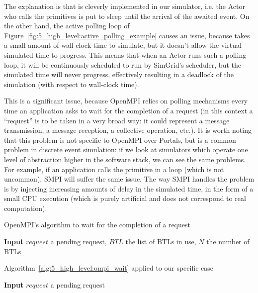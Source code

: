 The explanation is that  is cleverly implemented in our
simulator, i.e. the Actor who calls the primitives is put to sleep until the
arrival of the awaited event. On the other hand, the active polling loop of
Figure~\ref{fig:5_high_level:active_polling_example} causes an issue, because
 takes a small amount of wall-clock time to simulate, but it
doesn't allow the virtual simulated time to progress. This means that when an
Actor runs such a polling loop, it will be continuously scheduled to run by
SimGrid's scheduler, but the simulated time will never progress, effectively
resulting in a deadlock of the simulation (with respect to wall-clock time).

This is a significant issue, because OpenMPI relies on polling mechanisms every
time an application asks to wait for the completion of a request (in this
context a ``request'' is to be taken in a very broad way: it could represent a
message transmission, a message reception, a collective operation, etc.). It is
worth noting that this problem is not specific to OpenMPI over Portals, but is a
common problem in discrete event simulation: if we look at simulators which
operate one level of abstraction higher in the software stack, we can see the
same problems. For example, if an application calls the 
primitive in a loop (which is not uncommon), SMPI will suffer the same issue.
The way SMPI handles the problem is by injecting increasing amounts of delay in
the simulated time, in the form of a small CPU execution (which is purely
artificial and does not correspond to real computation).

\begin{algorithm}
    \caption{OpenMPI's algorithm to wait for the completion of a request}
    \hspace*{\algorithmicindent} \textbf{Input} $request$ a pending request, $BTL$ the list of BTLs in use, $N$ the number of BTLs
    \begin{algorithmic}[1]
        \EndFor
    \EndWhile
    \end{algorithmic}
    \label{alg:5_high_level:ompi_wait}
\end{algorithm}
\begin{algorithm}
    \caption{Algorithm~\ref{alg:5_high_level:ompi_wait} applied to our specific case}
    \hspace*{\algorithmicindent} \textbf{Input} $request$ a pending request
    \begin{algorithmic}[1]
    \EndWhile
    \end{algorithmic}
    \label{alg:5_high_level:ompi_wait_specific}
\end{algorithm}

